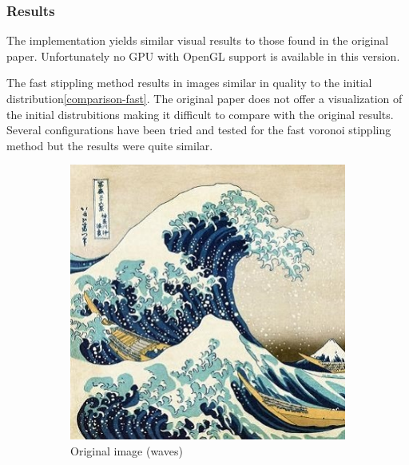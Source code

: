 \subsubsection{Results}
The implementation yields similar visual results to those found in the original paper. Unfortunately no GPU with OpenGL support is available in this version. 

The fast stippling method results in images similar in quality to the initial distribution\ref{comparison-fast}. The original paper does not offer a visualization of the initial distrubitions making it difficult to compare with the original results. Several configurations have been tried and tested for the fast voronoi stippling method but the results were quite similar. 

\begin{figure}[!htb]
\begin{subfigure}[h]{0.4\linewidth}
\includegraphics[width=\linewidth]{images/gw_square.jpg}
\caption{Original image (waves)}
\label{comparison-a}
\end{subfigure}
\hfill
\begin{subfigure}[h]{0.4\linewidth}

\end{subfigure}
\end{figure}

